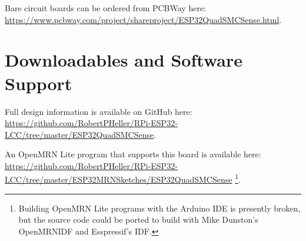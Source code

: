 Bare circuit boards can be ordered from PCBWay here: 
\url{https://www.pcbway.com/project/shareproject/ESP32QuadSMCSense.html}.

\section{Downloadables and Software Support}

Full design information is available on GitHub here:
\url{https://github.com/RobertPHeller/RPi-ESP32-LCC/tree/master/ESP32QuadSMCSense}.

An OpenMRN Lite program that supports this board is available here:
\url{https://github.com/RobertPHeller/RPi-ESP32-LCC/tree/master/ESP32MRNSketches/ESP32QuadSMCSense}
\footnote{Building OpenMRN Lite programs with the Arduino IDE is presently 
broken, but the source code could be ported to build with Mike Dunston's 
OpenMRNIDF and Esspressif's IDF.}.



